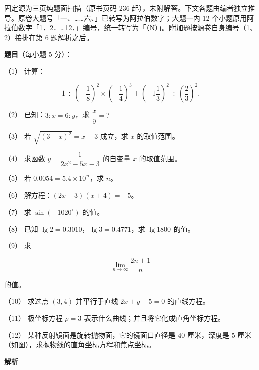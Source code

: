 

\begin{gktip}
固定源为三页纯题面扫描（原书页码 236 起），未附解答。下文各题由编者独立推导。原卷大题号「一、……六、」已转写为阿拉伯数字；大题一内 12 个小题原用阿拉伯数字「1．2．…12．」编号，统一转写为「（N）」。附加题按源卷自身编号（1、2）接排在第 6 题解析之后。
\end{gktip}

\begin{answer}

\textbf{题目}（每小题 5 分）：

（1） 计算：

\nopagebreak[4]
\[
1\div\left(-\frac18\right)^2\times\left(-\frac14\right)^3+\left(-1\frac13\right)^2\div\left(\frac23\right)^2.
\]

（2） 已知：$3:x=6:y$，求 $\dfrac{x}{y}=?$

（3） 若 $\sqrt{(3-x)^2}=x-3$ 成立，求 $x$ 的取值范围。

（4） 求函数 $y=\dfrac{1}{2x^2-5x-3}$ 的自变量 $x$ 的取值范围。

（5） 若 $0.0054=5.4\times10^n$，求 $n$。

（6） 解方程：$(2x-3)(x+4)=-5$。

（7） 求 $\sin(-1020^\circ)$ 的值。

（8） 已知 $\lg2=0.3010$，$\lg3=0.4771$，求 $\lg1800$ 的值。

（9） 求

\nopagebreak[4]
\[
\lim_{n\to\infty}\frac{2n+1}{n}
\]

的值。

（10） 求过点 $(3,4)$ 并平行于直线 $2x+y-5=0$ 的直线方程。

（11） 极坐标方程 $\rho=3$ 表示什么曲线；并且将它化成直角坐标方程。

（12） 某种反射镜面是旋转抛物面，它的镜面口直径是 $40$ 厘米，深度是 $5$ 厘米（如图），求抛物线的直角坐标方程和焦点坐标。
\nopagebreak[4]
\begin{center}\end{center}
\nopagebreak[4]
\textbf{解析}



\end{answer}

